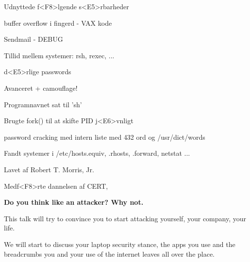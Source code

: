 \documentclass[Screen16to9,17pt,footrule]{foils}
\begin{document}

\begin{list2}
\item
\end{list2}


\begin{list1}
\item Udnyttede f<F8>lgende s<E5>rbarheder
\begin{list2}
\item buffer overflow i fingerd - VAX kode
\item  Sendmail - DEBUG
\item Tillid mellem systemer: rsh, rexec, ...
\item d<E5>rlige passwords
\end{list2}
\item Avanceret + camouflage!
\begin{list2}
\item Programnavnet sat til 'sh'
\item Brugte fork() til at skifte PID j<E6>vnligt
\item password cracking med intern liste med 432 ord og /usr/dict/words
\item Fandt systemer i /etc/hosts.equiv, .rhosts, .forward, netstat ...
\end{list2}
\item Lavet af Robert T. Morris, Jr.
\item Medf<F8>rte dannelsen af CERT, 
\end{list1}






\vskip 2cm

\begin{center}

\normalsize
\bf
Do you think like an attacker?
\vskip 5mm
Why not.
\end{center}

\begin{list2}
\item This talk will try to convince you to start attacking yourself, your company, your life.
\item We will start to discuss your laptop security stance, the apps you use and the breadcrumbs you and your use of the internet leaves all over the place.
\end{list2}
\end{document}
